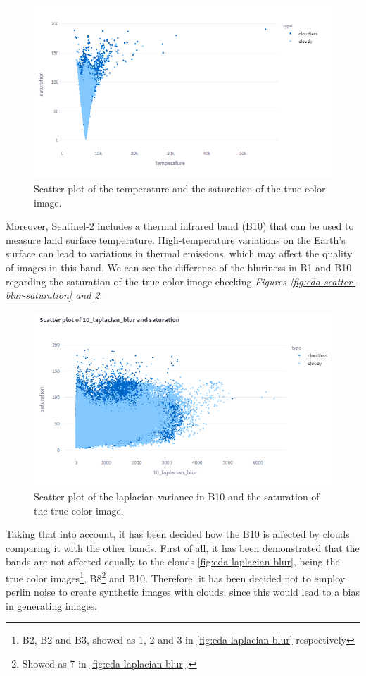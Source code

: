 \begin{figure}[H]
	\centering
	\includegraphics[width=13cm]{imgs/eda/saturation-temperature-outliers}
	\caption{Scatter plot of the temperature and the saturation of the true color image.}
	\label{fig:eda-scatter-temperature-saturation}
\end{figure} 
Moreover, Sentinel-2 includes a thermal infrared band (B10) that can be used to measure land surface temperature. High-temperature variations on the Earth's surface can lead to variations in thermal emissions, which may affect the quality of images in this band. We can see the difference of the bluriness in B1 and B10 regarding the saturation of the true color image checking \textit{Figures \ref{fig:eda-scatter-blur-saturation} and \ref{fig:eda-b10-blur-saturation}}.
\begin{figure}[H]
	\centering
	\includegraphics[width=13cm]{imgs/eda/b10-saturation-blurriness}
	\caption{Scatter plot of the laplacian variance in B10 and the saturation of the true color image.}
	\label{fig:eda-b10-blur-saturation}
\end{figure} 
Taking that into account, it has been decided how the B10 is affected by clouds comparing it with the other bands. First of all, it has been demonstrated that the bands are not affected equally to the clouds \ref{fig:eda-laplacian-blur}, being the true color images\footnote{B2, B2 and B3, showed as 1, 2 and 3 in \ref{fig:eda-laplacian-blur} respectively}, B8\footnote{Showed as 7 in \ref{fig:eda-laplacian-blur}.} and B10. Therefore, it has been decided not to employ perlin noise to create synthetic images with clouds, since this would lead to a bias in generating images.
